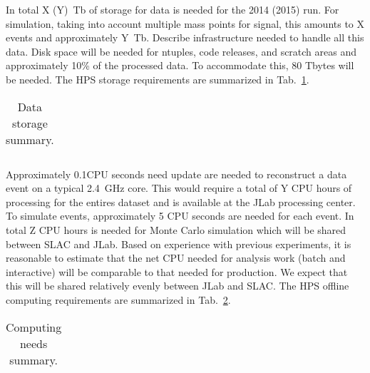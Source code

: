 In total {\color{red} X (Y)~Tb} of storage for data is needed for the 2014 (2015) run. For simulation, taking 
into account multiple mass points for signal, this amounts to {\color{red} X} events and approximately 
{\color{red} Y~Tb}. Describe infrastructure needed to handle all this data. 
Disk space will be needed for ntuples, code releases, and scratch areas and approximately 10\% of the 
processed data. To accommodate this, 80 Tbytes will be needed. The HPS storage requirements are summarized in Tab.~\ref{tab:datastorage}.
\begin{table}[tbp]
\centering
\begin{tabular}{|l|c|}
\hline
\hline
\end{tabular}
\caption{{\small Data storage summary.}}
\label{tab:datastorage}
\end{table}


Approximately 0.1CPU seconds {\color{red} need update} are needed to reconstruct a data event on 
a typical 2.4~GHz core. This would require a total of {\color{red} Y} CPU hours of processing for the 
entires dataset and is available at the JLab processing center.  To simulate events, approximately 5 CPU seconds are needed for each event. In total {\color{red} Z} CPU hours is needed for Monte Carlo 
simulation which will be shared between SLAC and JLab. 
Based on experience with previous experiments, it is reasonable to estimate that the net CPU needed for 
analysis work (batch and interactive) will be comparable to that needed for production. We expect 
that this will be shared relatively evenly between JLab and SLAC.  
The HPS offline computing requirements are summarized in Tab.~\ref{tab:computing}.
\begin{table}[tbp]
\centering
\begin{tabular}{|l|c|}
\hline
\hline
\end{tabular}
\caption{{\small Computing needs summary.}}
\label{tab:computing}
\end{table}
